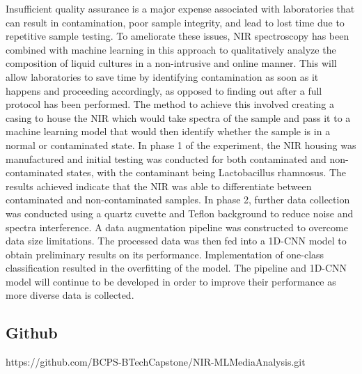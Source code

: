 \documentclass[12pt]{report}
\newcommand{\setparindent}{
    \setlength{\parskip}{1em} %
    \setlength{\parindent}{2.5em} %
}
\begin{document}
Insufficient quality assurance is a major expense associated with laboratories that can result in contamination, poor sample integrity, and lead to lost time due to repetitive sample testing. To ameliorate these issues, NIR spectroscopy has been combined with machine learning in this approach to qualitatively analyze the composition of liquid cultures in a non-intrusive and online manner. This will allow laboratories to save time by identifying contamination as soon as it happens and proceeding accordingly, as opposed to finding out after a full protocol has been performed. The method to achieve this involved creating a casing to house the NIR which would take spectra of the sample and pass it to a machine learning model that would then identify whether the sample is in a normal or contaminated state. In phase 1 of the experiment, the NIR housing was manufactured and initial testing was conducted for both contaminated and non-contaminated states, with the contaminant being Lactobacillus rhamnosus. The results achieved indicate that the NIR was able to differentiate between contaminated and non-contaminated samples. In phase 2, further data collection was conducted using a quartz cuvette and Teflon background to reduce noise and spectra interference. A data augmentation pipeline was constructed to overcome data size limitations. The processed data was then fed into a 1D-CNN model to obtain preliminary results on its performance. Implementation of one-class classification resulted in the overfitting of the model. The pipeline and 1D-CNN model will continue to be developed in order to improve their performance as more diverse data is collected.

\subsection*{Github}
\noindent https://github.com/BCPS-BTechCapstone/NIR-MLMediaAnalysis.git

\thispagestyle{empty}

\newpage
\tableofcontents
\thispagestyle{empty}
\newpage

\setparindent
\end{document}
